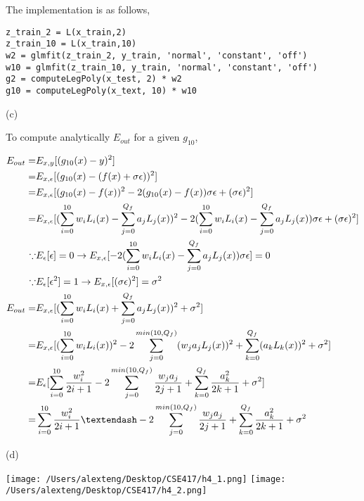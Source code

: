 \documentclass[11pt]{article}
\begin{document}
\begin{enumerate}
The implementation is as follows,
\begin{lstlisting}
z_train_2 = L(x_train,2)
z_train_10 = L(x_train,10)
w2 = glmfit(z_train_2, y_train, 'normal', 'constant', 'off')
w10 = glmfit(z_train_10, y_train, 'normal', 'constant', 'off')
g2 = computeLegPoly(x_test, 2) * w2
g10 = computeLegPoly(x_text, 10) * w10
\end{lstlisting}



(c)

To compute analytically $E_{out}$ for a given $g_{10}$, 

\begin{equation}
\begin{aligned}
E_{out} =& E_{x,y}[(g_{10}(x) - y)^2]\\
=& E_{x,\epsilon}[(g_{10}(x) - (f(x) + \sigma\epsilon))^2]\\
=& E_{x,\epsilon}[(g_{10}(x) - f(x))^2 -2(g_{10}(x) - f(x))\sigma\epsilon + (\sigma\epsilon)^2]\\
=& E_{x,\epsilon}[(\sum_{i=0}^{10}w_iL_i(x) - \sum_{j=0}^{Q_f}a_jL_j(x))^2 - 2(\sum_{i=0}^{10}w_iL_i(x) - \sum_{j=0}^{Q_f}a_jL_j(x))\sigma\epsilon + (\sigma\epsilon)^2]\\
\because & E_{\epsilon}[\epsilon] = 0 \rightarrow E_{x,\epsilon}[- 2(\sum_{i=0}^{10}w_iL_i(x) - \sum_{j=0}^{Q_f}a_jL_j(x))\sigma\epsilon] = 0\\
\because & E_{\epsilon}[\epsilon^2] = 1 \rightarrow E_{x,\epsilon} [(\sigma\epsilon)^2] = \sigma^2\\
E_{out} =  &E_{x,\epsilon}[(\sum_{i=0}^{10}w_iL_i(x) + \sum_{j=0}^{Q_f}a_jL_j(x))^2 + \sigma^2]\\
=& E_{x,\epsilon} [(\sum_{i=0}^{10}w_iL_i(x))^2 - 2\sum_{j=0}^{min(10,Q_f)}(w_ja_jL_j(x))^2 + \sum_{k=0}^{Q_f}(a_kL_k(x))^2 + \sigma^2]\\
=& E_{\epsilon} [\sum_{i=0}^{10}\frac{w_i^2}{2i+1} - 2\sum_{j=0}^{min(10,Q_f)}\frac{w_ja_j}{2j+1} + \sum_{k=0}^{Q_f} \frac{a_k^2}{2k+1} + \sigma^2]\\
=& \sum_{i=0}^{10}\frac{w_i^2}{2i+1} \textendash -2\sum_{j=0}^{min(10,Q_f)}\frac{w_ja_j}{2j+1} + \sum_{k=0}^{Q_f} \frac{a_k^2}{2k+1} + \sigma^2
\end{aligned}
\end{equation}

(d)

\texttt{[image: /Users/alexteng/Desktop/CSE417/h4\_1.png]}
\texttt{[image: /Users/alexteng/Desktop/CSE417/h4\_2.png]}


\end{enumerate}
\end{document}

